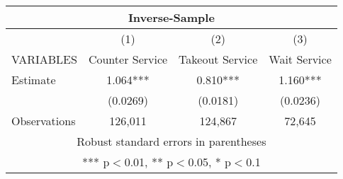 \begin{tabular}{lccc}
\multicolumn{4}{c}{Inverse-Sample} \\ \hline
 & (1) & (2) & (3) \\
VARIABLES & Counter Service & Takeout Service & Wait Service \\ \hline
Estimate & 1.064*** & 0.810*** & 1.160*** \\
 & (0.0269) & (0.0181) & (0.0236) \\
 Observations & 126,011 & 124,867 & 72,645 \\ \hline
\multicolumn{4}{c}{ Robust standard errors in parentheses} \\
\multicolumn{4}{c}{ *** p$<$0.01, ** p$<$0.05, * p$<$0.1} \\
\end{tabular}
